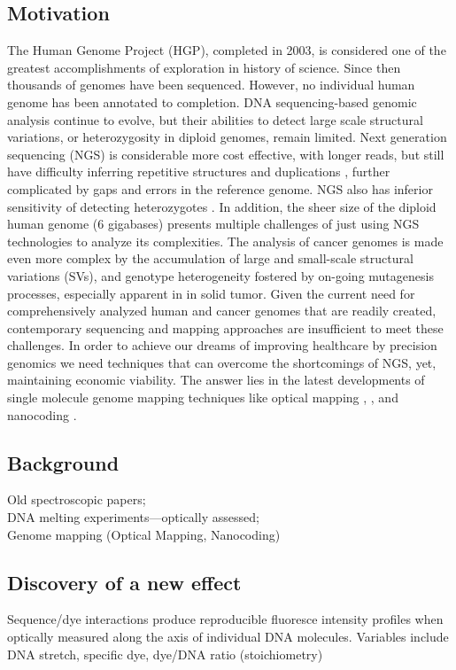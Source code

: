 \documentclass[11pt]{extarticle} %
\begin{document}
\subsection{Motivation}
The Human Genome Project (HGP), completed in 2003, is considered one of the greatest accomplishments of exploration in history of science. Since then thousands of genomes have been sequenced. However, no individual human genome has been annotated to completion. DNA sequencing-based genomic analysis continue to evolve, but their abilities to detect large scale structural variations, or heterozygosity in diploid genomes, remain limited. Next generation sequencing (NGS) is considerable more cost effective, with longer reads, but still have difficulty inferring repetitive structures and duplications \cite{Lander_etal_2001_Nature}, further complicated by gaps and errors in the reference genome. NGS also has inferior sensitivity of detecting heterozygotes \cite{Wheeler_etal_2008_Nature}. In addition, the sheer size of the diploid human genome (6 gigabases) presents multiple challenges of just using NGS technologies to analyze its complexities. The analysis of cancer genomes is made even more complex by the accumulation of large and small-scale structural variations (SVs), and genotype heterogeneity fostered by on-going mutagenesis processes, especially apparent in in solid tumor. Given the current need for comprehensively analyzed human and cancer genomes that are readily created, contemporary sequencing and mapping approaches are insufficient to meet these challenges. In order to achieve our dreams of improving healthcare by precision genomics we need techniques that can overcome the shortcomings of NGS, yet, maintaining economic viability. The answer lies in the latest developments of single molecule genome mapping techniques like optical mapping \cite{Dimalanta_etal_2004_AnalChem}, \cite{Teague_etal_2010_PNAS}, and nanocoding \cite{Jo_etal_2007_PNAS}. 

\subsection{Background} 
Old spectroscopic papers; \\
DNA melting experiments—optically assessed; \\
Genome mapping  (Optical Mapping, Nanocoding) \\

\subsection{Discovery of a new effect}
Sequence/dye interactions produce reproducible fluoresce intensity profiles when optically measured along the axis of individual DNA molecules. Variables include DNA stretch, specific dye, dye/DNA ratio (stoichiometry)
\end{document}
